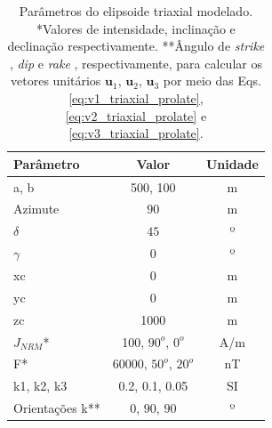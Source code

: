 \begin{table}[h!]
	\begin{center}
		\begin{tabular}{|l|c|c|}
			\hline
			\textbf{Parâmetro}  & \textbf{Valor}  & \textbf{Unidade}\\
			\hline 
			a, b  & 500, 100 & m\\
			\hline
			Azimute   & $90$ & m\\
			\hline
			$\delta$    & $45$ & º\\
			\hline
			$\gamma$   & $0$  & º\\
			\hline
			xc   & 0  & m\\
			\hline          
			yc   & 0  & m\\
			\hline                
			zc   & 1000  & m\\
			\hline
			$J_{NRM}$*  & 100, $90^o$, $0^o$  & A/m\\
			\hline
			F*    & 60000, $50^o$, $20^o$ & nT\\
			\hline
			k1, k2, k3   & 0.2, 0.1, 0.05  & SI\\
			\hline
			Orientações k**   & $0$, $90$, $90$  & º\\
			\hline
		\end{tabular}
		\caption{Parâmetros do elipsoide triaxial modelado. *Valores de intensidade, inclinação e declinação respectivamente. **Ângulo de \textit{strike} , \textit{dip}  e \textit{rake} , respectivamente, para calcular os vetores unitários $\mathbf{u}_{1}$, $\mathbf{u}_{2}$, $\mathbf{u}_{3}$ por meio das Eqs. \ref{eq:v1_triaxial_prolate}, \ref{eq:v2_triaxial_prolate} e \ref{eq:v3_triaxial_prolate}.}
	\end{center}
	\label{tab:triaxial_prolate2}
\end{table}

